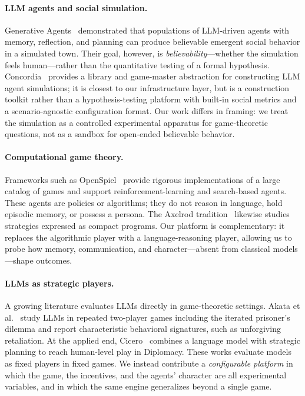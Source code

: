 \paragraph{LLM agents and social simulation.}
Generative Agents~\cite{park2023generative} demonstrated that populations of LLM-driven agents with memory, reflection, and planning can produce believable emergent social behavior in a simulated town. Their goal, however, is \emph{believability}---whether the simulation feels human---rather than the quantitative testing of a formal hypothesis. Concordia~\cite{vezhnevets2023concordia} provides a library and game-master abstraction for constructing LLM agent simulations; it is closest to our infrastructure layer, but is a construction toolkit rather than a hypothesis-testing platform with built-in social metrics and a scenario-agnostic configuration format. Our work differs in framing: we treat the simulation as a controlled experimental apparatus for game-theoretic questions, not as a sandbox for open-ended believable behavior.

\paragraph{Computational game theory.}
Frameworks such as OpenSpiel~\cite{lanctot2019openspiel} provide rigorous implementations of a large catalog of games and support reinforcement-learning and search-based agents. These agents are policies or algorithms; they do not reason in language, hold episodic memory, or possess a persona. The Axelrod tradition~\cite{axelrod1984evolution, rapoport1965prisoner} likewise studies strategies expressed as compact programs. Our platform is complementary: it replaces the algorithmic player with a language-reasoning player, allowing us to probe how memory, communication, and character---absent from classical models---shape outcomes.

\paragraph{LLMs as strategic players.}
A growing literature evaluates LLMs directly in game-theoretic settings. Akata et al.~\cite{akata2023playing} study LLMs in repeated two-player games including the iterated prisoner's dilemma and report characteristic behavioral signatures, such as unforgiving retaliation. At the applied end, Cicero~\cite{bakhtin2022diplomacy} combines a language model with strategic planning to reach human-level play in Diplomacy. These works evaluate models as fixed players in fixed games. We instead contribute a \emph{configurable platform} in which the game, the incentives, and the agents' character are all experimental variables, and in which the same engine generalizes beyond a single game.

